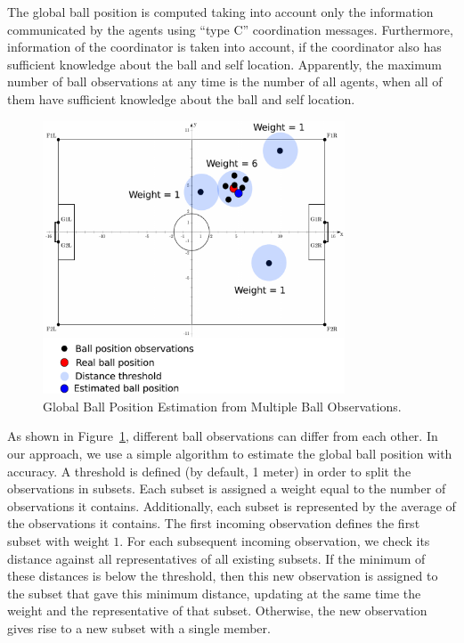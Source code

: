 The global ball position is computed taking into account only the information communicated by the agents using ``type C'' coordination messages. Furthermore, information of the coordinator is taken into account, if the coordinator also has sufficient knowledge about the ball and self location. Apparently, the maximum number of ball observations at any time is the number of all agents, when all of them have sufficient knowledge about the ball and self location.
\begin{figure}[t!]
\centering
  \includegraphics[width=0.8\textwidth]{Chapter4/figures/Ball.pdf}
  \caption{Global Ball Position Estimation from Multiple Ball Observations.} 
  \label{fig:Ball}
\end{figure}
As shown in Figure~\ref{fig:Ball}, different ball observations can differ from each other. In our approach, we use a simple algorithm to estimate the global ball position with accuracy. A threshold is defined (by default, 1 meter) in order to split the observations in subsets. Each subset is assigned a weight equal to the number of observations it contains. Additionally, each subset is represented by the average of the observations it contains. The first incoming observation defines the first subset with weight $1$. For each subsequent incoming observation, we check its distance against all representatives of all existing subsets. If the minimum of these distances is below the threshold, then this new observation is assigned to the subset that gave this minimum distance, updating at the same time the weight and the representative of that subset. Otherwise, the new observation gives rise to a new subset with a single member. 

